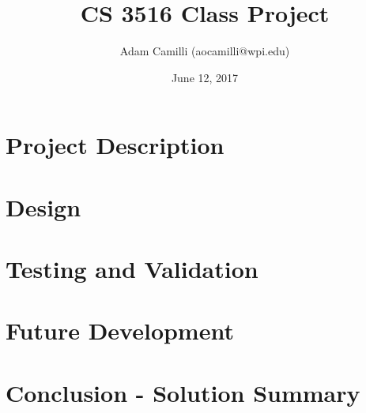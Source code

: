 \documentclass[titlepage]{article}
\title{CS 3516 Class Project}
\author{Adam Camilli (aocamilli@wpi.edu)}
\date{June 12, 2017}
\begin{document}
\maketitle

\begin{abstract}
\lipsum[1]
\end{abstract}

\tableofcontents

\newpage

\section{Project Description}

\section{Design}

\section{Testing and Validation}

\section{Future Development}

\section{Conclusion - Solution Summary}
\end{document}
